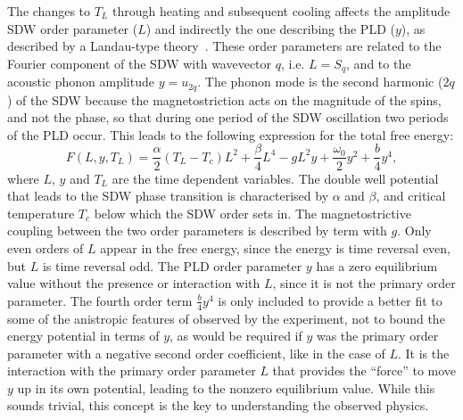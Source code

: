 The changes to $T_L$ through heating and subsequent cooling affects the amplitude SDW order parameter ($L$) and indirectly the one describing the PLD ($y$), as described by a Landau-type theory~\cite{Khomskii2010}.
These order parameters are related to the Fourier component of the SDW with wavevector $q$, i.e. $L = S_q$, and to the acoustic phonon amplitude $y = u_{2q}$.
The phonon mode is the second harmonic ($2q$) of the SDW because the magnetostriction acts on the magnitude of the spins, and not the phase, so that during one period of the SDW oscillation two periods of the PLD occur.
This leads to the following expression for the total free energy:
\begin{equation}
	\label{eq:Cr_landau}
	F(L, y, T_L) = \frac{\alpha}{2}(T_L - T_c) L^2 + \frac{\beta}{4} L^4 - g L^2 y + \frac{\omega_0}{2} y^2 + \frac{b}{4} y^4,
\end{equation}
where $L$, $y$ and $T_L$ are the time dependent variables.
The double well potential that leads to the SDW phase transition is characterised by $\alpha$ and $\beta$,  and critical temperature $T_c$ below which the SDW order sets in.
The magnetostrictive coupling between the two order parameters is described by term with $g$.
Only even orders of $L$ appear in the free energy, since the energy is time reversal even, but $L$ is time reversal odd.
The PLD order parameter $y$ has a zero equilibrium value without the presence or interaction with $L$, since it is not the primary order parameter.
The fourth order term $\frac{b}{4}y^4$ is only included to provide a better fit to some of the anistropic features of observed by the experiment, not to bound the energy potential in terms of $y$, as would be required if $y$ was the primary order parameter with a negative second order coefficient, like in the case of $L$.
It is the interaction with the primary order parameter $L$ that provides the ``force'' to move $y$ up in its own potential, leading to the nonzero equilibrium value.
While this sounds trivial, this concept is the key to understanding the observed physics.

